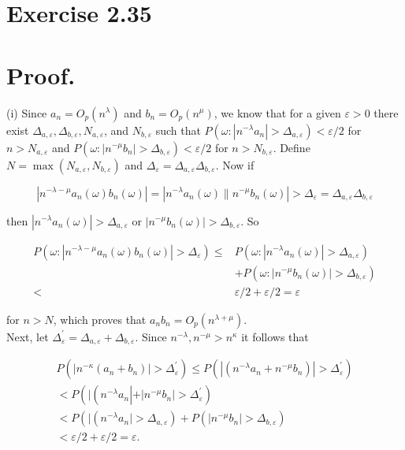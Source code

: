 \documentclass[10pt]{article}
\begin{document}
\section*{Exercise 2.35}
\section*{Proof.}
(i) Since $a_{n}=O_{p}\left(n^{\lambda}\right)$ and $b_{n}=O_{p}\left(n^{\mu}\right)$, we know that for a given $\varepsilon>0$ there exist $\Delta_{a, \varepsilon}, \Delta_{b, \varepsilon}, N_{a, \varepsilon}$, and $N_{b, \varepsilon}$ such that $P\left(\omega:\left|n^{-\lambda} a_{n}\right|>\right. \left.\Delta_{a, \varepsilon}\right)<\varepsilon / 2$ for $n>N_{a, \varepsilon}$ and $P\left(\omega:\left|n^{-\mu} b_{n}\right|>\Delta_{b, \varepsilon}\right)<\varepsilon / 2$ for $n>N_{b, \varepsilon}$. Define $N=\max \left(N_{a, \varepsilon}, N_{b, \varepsilon}\right)$ and $\Delta_{\varepsilon}=\Delta_{a, \varepsilon} \Delta_{b, \varepsilon}$. Now if

$$
\left|n^{-\lambda-\mu} a_{n}(\omega) b_{n}(\omega)\right|=\left|n^{-\lambda} a_{n}(\omega) \| n^{-\mu} b_{n}(\omega)\right|>\Delta_{\varepsilon}=\Delta_{a, \varepsilon} \Delta_{b, \varepsilon}
$$

then $\left|n^{-\lambda} a_{n}(\omega)\right|>\Delta_{a, \varepsilon}$ or $\left|n^{-\mu} b_{n}(\omega)\right|>\Delta_{b, \varepsilon}$. So

$$
\begin{aligned}
P\left(\omega:\left|n^{-\lambda-\mu} a_{n}(\omega) b_{n}(\omega)\right|>\Delta_{\varepsilon}\right) \leq & P\left(\omega:\left|n^{-\lambda} a_{n}(\omega)\right|>\Delta_{a, \varepsilon}\right) \\
& +P\left(\omega:\left|n^{-\mu} b_{n}(\omega)\right|>\Delta_{b, \varepsilon}\right) \\
< & \varepsilon / 2+\varepsilon / 2=\varepsilon
\end{aligned}
$$

for $n>N$, which proves that $a_{n} b_{n}=O_{p}\left(n^{\lambda+\mu}\right)$.\\
Next, let $\Delta_{\varepsilon}^{\prime}=\Delta_{a, \varepsilon}+\Delta_{b, \varepsilon}$. Since $n^{-\lambda}, n^{-\mu}>n^{\kappa}$ it follows that

$$
\begin{gathered}
P\left(\left|n^{-\kappa}\left(a_{n}+b_{n}\right)\right|>\Delta_{\varepsilon}^{\prime}\right) \leq P\left(\left|\left(n^{-\lambda} a_{n}+n^{-\mu} b_{n}\right)\right|>\Delta_{\varepsilon}^{\prime}\right) \\
<P\left(\mid\left(n^{-\lambda} a_{n}\left|+\left|n^{-\mu} b_{n}\right|>\Delta_{\varepsilon}^{\prime}\right)\right.\right. \\
<P\left(\mid\left(n^{-\lambda} a_{n} \mid>\Delta_{a, \varepsilon}\right)+P\left(\left|n^{-\mu} b_{n}\right|>\Delta_{b, \varepsilon}\right)\right. \\
<\varepsilon / 2+\varepsilon / 2=\varepsilon .
\end{gathered}
$$
\end{document}
